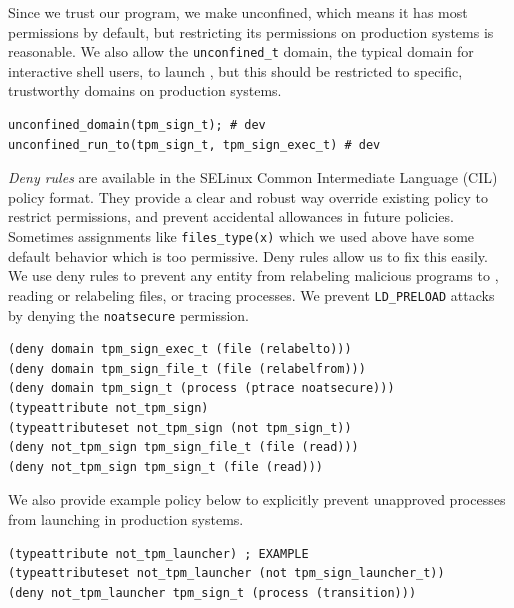 \documentclass[12pt,letterpaper]{kuthesis}
\begin{document}
Since we trust our \tpmsign program, we make \domaint unconfined, which means it has most permissions by default,
but restricting its permissions on production systems is reasonable.
We also allow the \verb|unconfined_t| domain, the typical domain for interactive shell users, to launch \tpmsign,
but this should be restricted to specific, trustworthy domains on production systems.
\begin{lstlisting}[style=selinux-policy]
unconfined_domain(tpm_sign_t); # dev
unconfined_run_to(tpm_sign_t, tpm_sign_exec_t) # dev
\end{lstlisting}

\emph{Deny rules} are available in the SELinux Common Intermediate Language (CIL) policy format.
They provide a clear and robust way override existing policy to restrict permissions,
and prevent accidental allowances in future policies.
Sometimes assignments like \verb|files_type(x)| which we used above have some default behavior which is too permissive.
Deny rules allow us to fix this easily.
We use deny rules to prevent any entity from relabeling malicious programs to \exect, reading or relabeling \filet files,
or tracing \domaint processes. We prevent \verb|LD_PRELOAD| attacks by denying the \verb|noatsecure| permission.
\begin{lstlisting}[style=selinux-cil]
(deny domain tpm_sign_exec_t (file (relabelto)))
(deny domain tpm_sign_file_t (file (relabelfrom)))
(deny domain tpm_sign_t (process (ptrace noatsecure)))
(typeattribute not_tpm_sign)
(typeattributeset not_tpm_sign (not tpm_sign_t))
(deny not_tpm_sign tpm_sign_file_t (file (read)))
(deny not_tpm_sign tpm_sign_t (file (read)))
\end{lstlisting}

We also provide example policy below to explicitly prevent unapproved processes from launching \tpmsign in production systems.
\begin{lstlisting}[style=selinux-cil]
(typeattribute not_tpm_launcher) ; EXAMPLE
(typeattributeset not_tpm_launcher (not tpm_sign_launcher_t))
(deny not_tpm_launcher tpm_sign_t (process (transition)))
\end{lstlisting}
\end{document}
